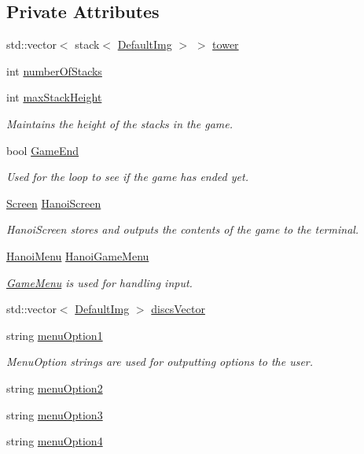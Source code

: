 \subsection*{Private Attributes}
\begin{DoxyCompactItemize}
\item 
std\-::vector$<$ stack$<$ \hyperlink{classDefaultImg}{Default\-Img} $>$ $>$ \hyperlink{classHanoi_afe67c656c8ce8c7006e8b7f23fbe9ae9}{tower}
\item 
int \hyperlink{classHanoi_abcdaa5a4b56f9c3916bf49e054e1cf8c}{number\-Of\-Stacks}
\item 
int \hyperlink{classHanoi_a826f3bc786cb5c7b6499508d0b8bc9b4}{max\-Stack\-Height}
\begin{DoxyCompactList}\small\item\em Maintains the height of the stacks in the game. \end{DoxyCompactList}\item 
bool \hyperlink{classHanoi_aff7a10d6c208cb15d315436b91017bed}{Game\-End}
\begin{DoxyCompactList}\small\item\em Used for the loop to see if the game has ended yet. \end{DoxyCompactList}\item 
\hyperlink{classScreen}{Screen} \hyperlink{classHanoi_a1b9bfd6a0428f772d78b66a5a3268c4c}{Hanoi\-Screen}
\begin{DoxyCompactList}\small\item\em Hanoi\-Screen stores and outputs the contents of the game to the terminal. \end{DoxyCompactList}\item 
\hyperlink{classHanoiMenu}{Hanoi\-Menu} \hyperlink{classHanoi_a7d73005d59c4f2134ffd564964ab3f49}{Hanoi\-Game\-Menu}
\begin{DoxyCompactList}\small\item\em \hyperlink{classGameMenu}{Game\-Menu} is used for handling input. \end{DoxyCompactList}\item 
std\-::vector$<$ \hyperlink{classDefaultImg}{Default\-Img} $>$ \hyperlink{classHanoi_a67a8288cd0c9a1acc3e5201621505afa}{discs\-Vector}
\item 
string \hyperlink{classHanoi_a9f971c51b287b61d8a919c26780e3f66}{menu\-Option1}
\begin{DoxyCompactList}\small\item\em Menu\-Option strings are used for outputting options to the user. \end{DoxyCompactList}\item 
string \hyperlink{classHanoi_ac9345e1760d1367ee05ecdf2e15d3d69}{menu\-Option2}
\item 
string \hyperlink{classHanoi_a94c22f2842c5473df08839fc9d4e860f}{menu\-Option3}
\item 
string \hyperlink{classHanoi_a3c6ac9ab6b2941ab955a2bc2c58cf93a}{menu\-Option4}
\end{DoxyCompactItemize}
